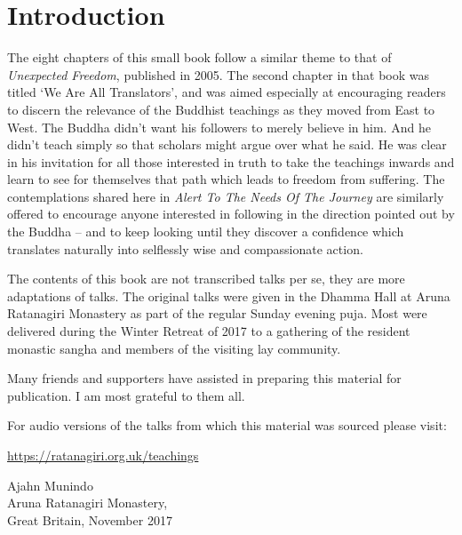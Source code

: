 
\chapter{Introduction}

The eight chapters of this small book follow a similar theme to that of
\emph{Unexpected Freedom}, published in 2005. The second chapter in that book
was titled ‘We Are All Translators’, and was aimed especially at
encouraging readers to discern the relevance of the Buddhist teachings
as they moved from East to West. The Buddha didn’t want his followers to
merely believe in him. And he didn’t teach simply so that scholars might
argue over what he said. He was clear in his invitation for all those
interested in truth to take the teachings inwards and learn to see for
themselves that path which leads to freedom from suffering. The
contemplations shared here in \emph{Alert To The Needs Of The Journey} are
similarly offered to encourage anyone interested in following in the
direction pointed out by the Buddha – and to keep looking until they
discover a confidence which translates naturally into selflessly wise
and compassionate action.

The contents of this book are not transcribed talks per se, they are
more adaptations of talks. The original talks were given in the Dhamma
Hall at Aruna Ratanagiri Monastery as part of the regular Sunday evening
puja. Most were delivered during the Winter Retreat of 2017 to a
gathering of the resident monastic sangha and members of the visiting
lay community.

Many friends and supporters have assisted in preparing this material for
publication. I am most grateful to them all.

For audio versions of the talks from which this material was sourced please
visit:

\href{https://ratanagiri.org.uk/teachings}{https://ratanagiri.org.uk/teachings}

\enlargethispage*{2\baselineskip}

{\raggedleft
Ajahn Munindo \\
Aruna Ratanagiri Monastery, \\
Great Britain, November 2017
\par}

